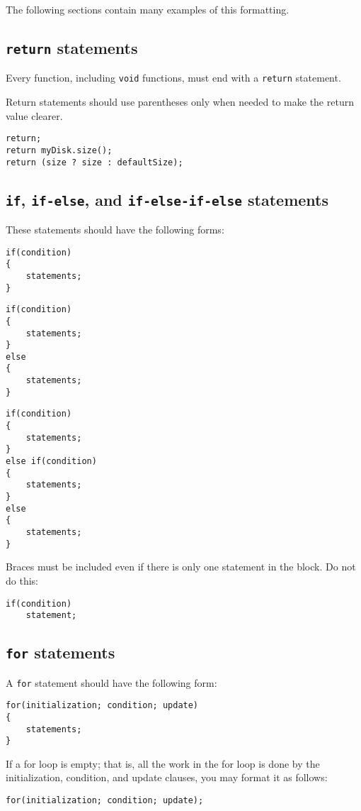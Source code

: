 \documentclass{article}
\newcommand{\code}[1]{\texttt{\colorbox{gray!30}{#1}}}
\begin{document}
The following sections contain many examples of this formatting.

\subsection{\code{return} statements}
Every function, including \code{void} functions, must end with a \code{return} statement.

Return statements should use parentheses only when needed to make the return value clearer.
\begin{lstlisting}
return;
return myDisk.size();
return (size ? size : defaultSize);
\end{lstlisting}

\subsection{\code{if}, \code{if-else}, and \code{if-else-if-else} statements}
These statements should have the following forms:
\begin{lstlisting}
if(condition)
{
	statements;
}
\end{lstlisting}
\begin{lstlisting}
if(condition)
{
	statements;
}
else
{
	statements;
}
\end{lstlisting}
\begin{lstlisting}
if(condition)
{
	statements;
}
else if(condition)
{
	statements;
}
else
{
	statements;
}
\end{lstlisting}

Braces must be included even if there is only one statement in the block.
Do not do this:
\begin{lstlisting}
if(condition)
	statement;
\end{lstlisting}

\subsection{\code{for} statements}
A \code{for} statement should have the following form:
\begin{lstlisting}
for(initialization; condition; update)
{
	statements;
}
\end{lstlisting}

If a for loop is empty; that is, all the work in the for loop is done by the initialization, condition, and update clauses, you may format it as follows:
\begin{lstlisting}
for(initialization; condition; update);
\end{lstlisting}
\end{document}
